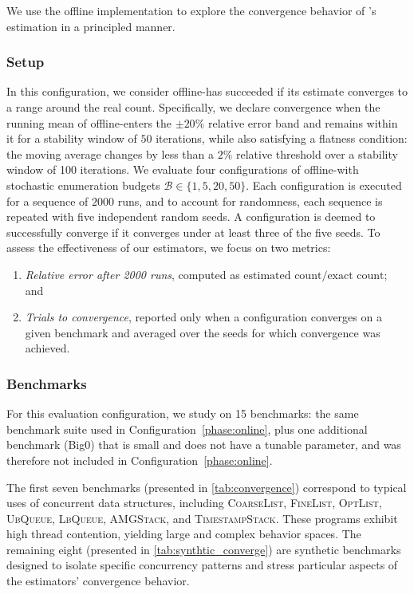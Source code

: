 We use the offline implementation to  explore the convergence behavior of \testor's estimation in a principled manner.

\subsubsection*{Setup}
In this configuration, we consider offline-\testor has succeeded if its estimate converges to a range around the real count. 
Specifically, we declare convergence when the running mean of offline-\testor enters the $\pm20\%$ relative error band and remains within it for a stability window of 
$50$ iterations, while also satisfying a flatness condition: the moving average changes by less than a $2\%$ relative threshold over a stability window of 100 iterations.
We evaluate four configurations of offline-\testor with stochastic enumeration budgets $\mathcal{B} \in \{1, 5, 20, 50\}$. 
Each configuration is executed for a sequence of $2000$ runs, and to account for randomness, each sequence is repeated with five independent random seeds. 
A configuration is deemed to successfully converge if it converges under at least three of the five seeds. 
To assess the effectiveness of our estimators, we focus on two metrics:
\begin{enumerate}
    \item \emph{Relative error after 2000 runs}, computed as $\text{estimated count} / \text{exact count}$; and
    \item \emph{Trials to convergence}, reported only when a configuration converges on a given benchmark and averaged over the seeds for which convergence was achieved.
\end{enumerate}

\subsubsection*{Benchmarks}

For this evaluation configuration, we study \testor on 15 benchmarks: the same benchmark suite used in Configuration~\ref{phase:online}, plus one additional benchmark (Big0) that is small and does not have a tunable parameter, and was therefore not included in Configuration~\ref{phase:online}.
 
The first seven benchmarks (presented in \cref{tab:convergence}) correspond to typical uses of concurrent data structures, 
including \textsc{CoarseList}, \textsc{FineList}, \textsc{OptList}, \textsc{UbQueue}, \textsc{LbQueue}, \textsc{AMGStack}, and \textsc{TimestampStack}. 
These programs exhibit high thread contention, yielding large and complex behavior spaces. 
The remaining eight (presented in \cref{tab:synthtic_converge}) are synthetic benchmarks designed to isolate specific concurrency 
patterns and stress particular aspects of the estimators’ convergence behavior.

